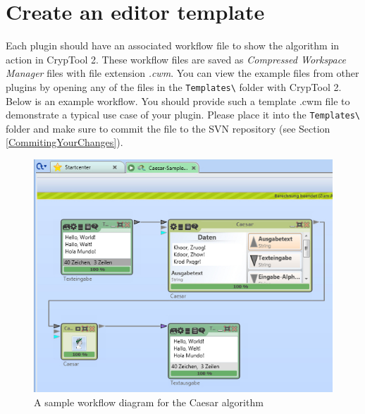 \section{Create an editor template}
\label{DrawingTheWorkfloweOfYourPlugin}

Each plugin should have an associated workflow file to show the algorithm in action in CrypTool 2. These workflow files are saved as \textit{Compressed Workspace Manager} files with file extension \textit{.cwm}. You can view the example files from other plugins by opening any of the files in the \texttt{Templates\textbackslash} folder with CrypTool 2. Below is an example workflow. You should provide such a template .cwm file to demonstrate a typical use case of your plugin. Please place it into the \texttt{Templates\textbackslash} folder and make sure to commit the file to the SVN repository (see Section \ref{CommitingYourChanges}).

\begin{figure}[h]
	\centering
		\includegraphics{figures/sample.jpg}
	\caption{A sample workflow diagram for the Caesar algorithm}
	\label{fig:sample}
\end{figure}
